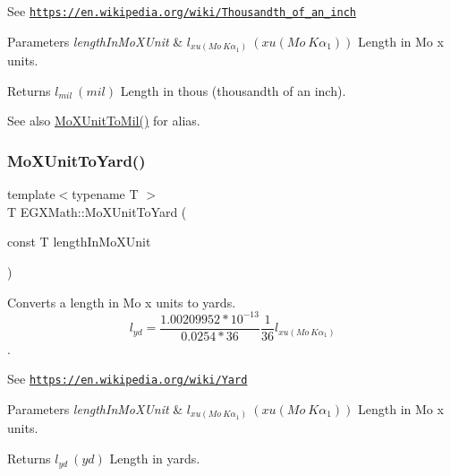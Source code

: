 See \href{https://en.wikipedia.org/wiki/Thousandth_of_an_inch}{\tt https\+://en.\+wikipedia.\+org/wiki/\+Thousandth\+\_\+of\+\_\+an\+\_\+inch} 
\begin{DoxyParams}{Parameters}
{\em length\+In\+Mo\+X\+Unit} & $ l_{xu(Mo\ K\alpha_1)}\ (xu(Mo\ K\alpha_1))$ Length in Mo x units. \\
\hline
\end{DoxyParams}
\begin{DoxyReturn}{Returns}
$ l_{mil}\ (mil)$ Length in thous (thousandth of an inch). 
\end{DoxyReturn}
\begin{DoxySeeAlso}{See also}
\mbox{\hyperlink{group___e_g_x_math-_conversions-_length_conversions-_non-_s_i-_mo_x_unit-_imperial_gaa73c49ecabd4f9db771fac592ff7449a}{Mo\+X\+Unit\+To\+Mil()}} for alias. 
\end{DoxySeeAlso}
\mbox{\label{group___e_g_x_math-_conversions-_length_conversions-_non-_s_i-_mo_x_unit-_imperial_ga1b769f8b903e65e8d7027a9c427762ab}} 
\subsubsection{\texorpdfstring{Mo\+X\+Unit\+To\+Yard()}{MoXUnitToYard()}}
{\footnotesize\ttfamily template$<$typename T $>$ \\
T E\+G\+X\+Math\+::\+Mo\+X\+Unit\+To\+Yard (\begin{DoxyParamCaption}\item[{const T}]{length\+In\+Mo\+X\+Unit }\end{DoxyParamCaption})}



Converts a length in Mo x units to yards. \[ l_{yd}= \frac{1.00209952*10^{-13}}{0.0254 * 36} \frac{1}{36} l_{xu(Mo\ K\alpha_1)} \]. 

See \href{https://en.wikipedia.org/wiki/Yard}{\tt https\+://en.\+wikipedia.\+org/wiki/\+Yard} 
\begin{DoxyParams}{Parameters}
{\em length\+In\+Mo\+X\+Unit} & $ l_{xu(Mo\ K\alpha_1)}\ (xu(Mo\ K\alpha_1))$ Length in Mo x units. \\
\hline
\end{DoxyParams}
\begin{DoxyReturn}{Returns}
$ l_{yd}\ (yd)$ Length in yards. 
\end{DoxyReturn}
